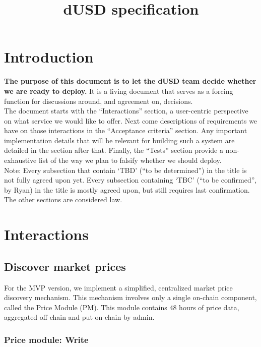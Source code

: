 \documentclass{article} %
\title{dUSD specification}
\begin{document}
\maketitle

\section{Introduction}

\textbf{The purpose of this document is to let the dUSD team decide whether we are ready to deploy.}
It is a living document that serves as a forcing function for discussions
around, and agreement on, decisions. \\

The document starts with the ``Interactions'' section, a user-centric
perspective on what service we would like to offer.
Next come descriptions of requirements we have on those interactions in the
``Acceptance criteria'' section.
Any important implementation details that will be relevant for building such a
system are detailed in the section after that.
Finally, the ``Tests'' section provide a non-exhaustive list of the way we plan
to falsify whether we should deploy. \\

Note: Every subsection that contain `TBD' (``to be determined'') in the title is
not fully agreed upon yet.
Every subsection containing `TBC' (``to be confirmed'', by Ryan) in the title is
mostly agreed upon, but still requires last confirmation.
The other sections are considered law.

\section{Interactions}

\subsection{Discover market prices}

For the MVP version, we implement a simplified, centralized market price
discovery mechanism.
This mechanism involves only a single on-chain component, called the Price
Module (PM).
This module contains $48$ hours of price data, aggregated off-chain and put
on-chain by admin.

\subsubsection{Price module: Write}
\end{document}
